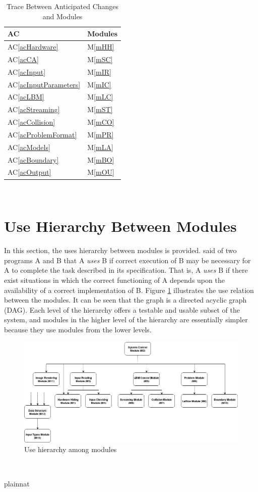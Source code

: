 \documentclass[12pt, titlepage]{article}
\newcommand{\acref}[1]{AC\ref{#1}}
\newcommand{\mref}[1]{M\ref{#1}}
\begin{document}
\begin{table}[H]
\centering
\begin{tabular}{p{} p{}}
\toprule
\textbf{AC} & \textbf{Modules}\\
\midrule
\acref{acHardware} & \mref{mHH}\\
\acref{acCA} & \mref{mSC}\\
\acref{acInput} & \mref{mIR}\\
\acref{acInputParameters} & \mref{mIC}\\
\acref{acLBM} & \mref{mLC}\\
\acref{acStreaming} & \mref{mST}\\
\acref{acCollision} & \mref{mCO}\\
\acref{acProblemFormat} & \mref{mPR}\\
\acref{acModels} & \mref{mLA}\\
\acref{acBoundary} & \mref{mBO}\\
\acref{acOutput} & \mref{mOU}\\
\bottomrule
\end{tabular}
\caption{Trace Between Anticipated Changes and Modules}
\label{TblACT}
\end{table}

~\newpage

\section{Use Hierarchy Between Modules} \label{SecUse}

In this section, the uses hierarchy between modules is
provided. \citet{Parnas1978} said of two programs A and B that A {\em uses} B if
correct execution of B may be necessary for A to complete the task described in
its specification. That is, A {\em uses} B if there exist situations in which
the correct functioning of A depends upon the availability of a correct
implementation of B.  Figure \ref{FigUH} illustrates the use relation between
the modules. It can be seen that the graph is a directed acyclic graph
(DAG). Each level of the hierarchy offers a testable and usable subset of the
system, and modules in the higher level of the hierarchy are essentially simpler
because they use modules from the lower levels.

\begin{figure}[H]
\centering
\includegraphics[width=1.0\textwidth]{DAG_CAS741}
\caption{Use hierarchy among modules}
\label{FigUH}
\end{figure}

~\newpage

 {plainnat}

\end{document}
